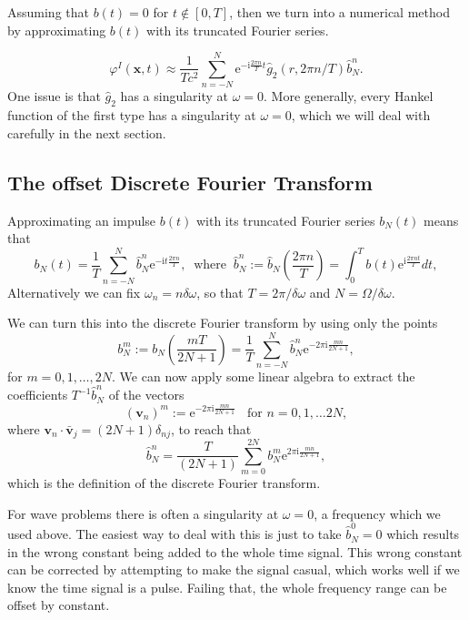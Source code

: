 \documentclass[ 12pt, a4paper]{article}
\newcommand{\be}{\begin{equation}}
\newcommand{\en}{\end{equation}}
\newcommand{\ii}{\textrm{i}}
\newcommand{\ee}{\textrm{e}}
\renewcommand{\vec}[1]{\boldsymbol{#1}}
\begin{document}
Assuming that $b(t) = 0$ for $t \not \in [0, T]$, then we turn into a numerical method by approximating $b(t)$ with its truncated Fourier series.

\be
\varphi^I(\vec x,t) \approx \frac{1}{T c^2}   \sum_{n = - N}^N \ee^{-\ii \frac { 2 \pi n }{T} t}  \hat g_2(r ,2 \pi n /T) \hat b_N^n   .
\label{eqn:ConvolutionWithGreen2DN}
\en
One issue is that $\hat g_2$ has a singularity at $\omega =0$. More generally, every Hankel function of the first type has a singularity at $\omega =0$,  which we will deal with carefully in the next section.

\subsection{The offset Discrete Fourier Transform}
 Approximating an impulse $b(t)$ with its truncated Fourier series $b_N(t)$ means that
\be
b_N(t) = \frac{1}{T} \sum_{n = -N}^{ N} \hat b_N^n \ee^{- \ii t \frac{2 \pi n}{T}}, \;\; \text{where} \;\; \hat b_N^n := \hat b_N\left (\frac{2 \pi n}{T}\right ) =  \int_0^T b(t) \ee^{\ii \frac{2 \pi n t}{T}} dt,
\en
Alternatively we can fix $\omega_n = n \delta \omega$, so that $T = 2\pi/\delta \omega$ and $N= \Omega/\delta \omega$.

We can turn this into the discrete Fourier transform by using only the points
\be
b_N^m := b_N \left (\frac{m T}{2N +1}\right )= \frac{1}{T} \sum_{n = -N}^{ N} \hat b^n_N \ee^{-2 \pi  \ii  \frac{ m n}{2N +1}},
\en
for $m= 0, 1, \ldots, 2 N$. We can now apply some linear algebra to extract the coefficients $T^{-1}\hat b^{n}_N$ of the vectors
\be
(\vec v_n)^m:=  \ee^{-2 \pi  \ii  \frac{ m n }{2 N + 1}}  \;\; \text{ for } n=0, 1,  \ldots 2 N,
\en
 where $\vec v_n \cdot \bar{\vec v}_j = (2 N +1) \delta_{nj}$, to reach that
\be
\hat b^{n}_N  = \frac{T}{(2 N +1)} \sum_{m=0}^{2 N} b_N^m \ee^{2 \pi  \ii  \frac{ m n }{2 N + 1}},
\en
which is the definition of the discrete Fourier transform.

For wave problems there is often a singularity at $\omega =0$, a frequency which we used above. The easiest way to deal with this is just to take $\hat b^0_N =0$ which results in the wrong constant being added to the whole time signal. This wrong constant can be corrected by attempting to make the signal casual, which works well if we know the time signal is a pulse. Failing that, the whole frequency range can be offset by constant.
\end{document}
